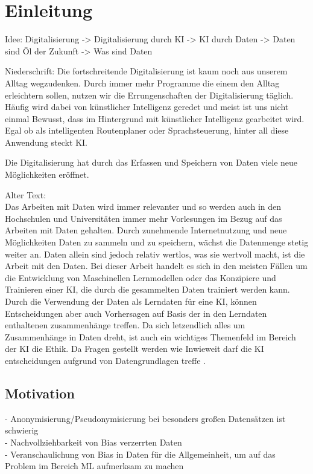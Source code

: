 \chapter{Einleitung}
    \label{sec:einleitung}
    
    Idee:
    Digitalisierung -> Digitalisierung durch KI -> KI durch Daten -> Daten sind Öl der Zukunft -> Was sind Daten
    
    Niederschrift:
    Die fortschreitende Digitalisierung ist kaum noch aus unserem Alltag wegzudenken. Durch immer mehr Programme die einem den Alltag erleichtern sollen, nutzen wir die Errungenschaften der Digitalisierung täglich. Häufig wird dabei von künstlicher Intelligenz geredet und meist ist uns nicht einmal Bewusst, dass im Hintergrund mit künstlicher Intelligenz gearbeitet wird. Egal ob als intelligenten Routenplaner oder Sprachsteuerung, hinter all diese Anwendung steckt \ac{KI}.

    Die Digitalisierung hat durch das Erfassen und Speichern von Daten viele neue Möglichkeiten eröffnet. 


    Alter Text:
    \\
    Das Arbeiten mit Daten wird immer relevanter und so werden auch in den Hochschulen und Universitäten immer mehr Vorlesungen im Bezug auf das Arbeiten mit Daten gehalten. Durch zunehmende Internetnutzung und neue Möglichkeiten Daten zu sammeln und zu speichern, wächst die Datenmenge stetig weiter an. Daten allein sind jedoch relativ wertlos, was sie wertvoll macht, ist die Arbeit mit den Daten. Bei dieser Arbeit handelt es sich in den meisten Fällen um die Entwicklung von Maschinellen Lernmodellen oder das Konzipiere und Trainieren einer \ac{KI}, die durch die gesammelten Daten trainiert werden kann. Durch die Verwendung der Daten als Lerndaten für eine \ac{KI}, können Entscheidungen aber auch Vorhersagen auf Basis der in den Lerndaten enthaltenen zusammenhänge treffen. Da sich letzendlich alles um Zusammenhänge in Daten dreht, ist auch ein wichtiges Themenfeld im Bereich der \ac{KI} die Ethik. Da Fragen gestellt werden wie \dq Inwieweit darf die \ac{KI} entscheidungen aufgrund von Datengrundlagen treffe \dq. \cite{dullien2018}


    \section{Motivation}
    \label{subsec:motivation}

    -	Anonymisierung/Pseudonymisierung bei besonders gro{\ss}en Datensätzen ist schwierig \\
    -	Nachvollziehbarkeit von Bias verzerrten Daten \\
    -	Veranschaulichung von Bias in Daten für die Allgemeinheit, um auf das Problem im Bereich ML aufmerksam zu machen 

